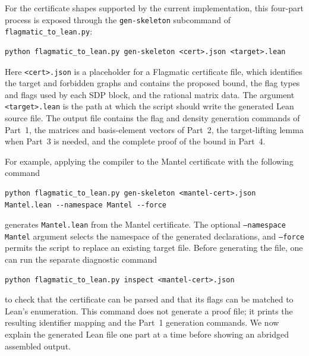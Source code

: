 \documentclass{article}
\newcommand{\lean}[1]{\texttt{#1}}
\begin{document}
For the certificate shapes supported by the current implementation, this
four-part process is exposed through the \lean{gen-skeleton} subcommand of
\lean{flagmatic\_to\_lean.py}:
\begin{lstlisting}[language={}]
python flagmatic_to_lean.py gen-skeleton <cert>.json <target>.lean
\end{lstlisting}
Here \lean{<cert>.json} is a placeholder for a Flagmatic certificate file, which
identifies the target and forbidden graphs and contains the proposed bound,
the flag types and flags used by each SDP block, and the rational matrix data.  The
argument \lean{<target>.lean} is the path at which the script should write the
generated Lean source file.  The output file contains the flag and
density generation commands of Part~1, the matrices and basis-element vectors
of Part~2, the target-lifting lemma when Part~3 is needed, and the complete
proof of the bound in Part~4.

For example, applying the compiler to the Mantel certificate with
the following command
\begin{lstlisting}[language={}]
python flagmatic_to_lean.py gen-skeleton <mantel-cert>.json Mantel.lean --namespace Mantel --force
\end{lstlisting}
generates \lean{Mantel.lean} from the Mantel certificate.  The optional
\lean{--namespace Mantel} argument selects the namespace of the generated
declarations, and \lean{--force} permits the script to replace an existing
target file.  Before generating the file, one can run the separate diagnostic
command
\begin{lstlisting}[language={}]
python flagmatic_to_lean.py inspect <mantel-cert>.json
\end{lstlisting}
to check that the certificate can be parsed and that its flags can be matched
to Lean's enumeration.  This command does not generate a proof file; it prints
the resulting identifier mapping and the Part~1 generation commands.  We now
explain the generated Lean file one part at a time before showing an abridged
assembled output.
\end{document}
